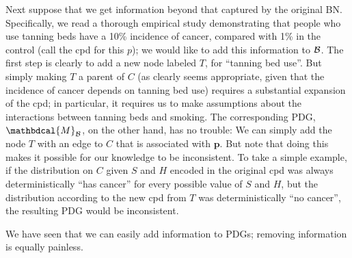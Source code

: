 \documentclass{article}
\theoremstyle{plain}
\theoremstyle{definition}
\theoremstyle{remark}
\newcommand\mat[1]{\mathbf{#1}}
\newcommand{\dg}[1]{\mathbdcal{#1}}
\newcommand{\PDGof}[1]{{\dg M}_{#1}}
\numberwithin{equation}{section}
\begin{document}
\begin{example}[emulating a BN]
Next suppose that we get information beyond that captured by the original BN.
Specifically, we read a thorough empirical study demonstrating that people who
use tanning beds have a 10\% incidence of cancer, compared with 1\% in the
control (call the cpd for this $p$); we would like to add this information to
$\cal B$. The first step is clearly to add a new node labeled $T$, for ``tanning
bed use''.  But simply making $T$ a parent of $C$ (as clearly seems appropriate,
given that the incidence of cancer depends on tanning bed use) requires a
substantial expansion of the cpd; in particular, it requires us to make
assumptions about the interactions between tanning beds and smoking.  
%
The corresponding PDG, $\PDGof{{\mathcal B}}$, on the other hand, has no
trouble: We can simply add the node $T$ with an edge to $C$ that is associated
with $\mat p$.  But note that doing this makes it possible for our knowledge to
be inconsistent. To take a simple example, if the distribution on $C$ given $S$
and $H$ encoded in the original cpd was always deterministically ``has cancer''
for every possible value of $S$ and $H$, but the distribution according to the
new cpd from $T$ was deterministically ``no cancer'', the resulting PDG would be
inconsistent.  
%
\end{example}


We have seen that we can easily add information to PDGs; removing information is
equally painless.   
\end{document}
